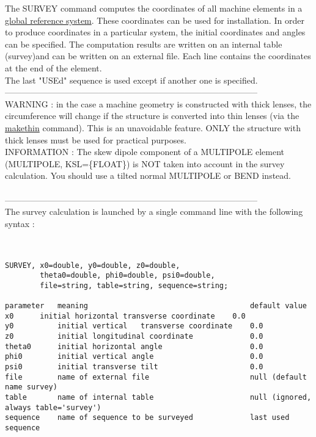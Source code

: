  The SURVEY command computes the coordinates of all machine elements in a \href{../Introduction/conventions.html}{global reference system}. These coordinates can be used for installation. In order to produce coordinates in a particular system, the initial coordinates and angles can be specified. The computation results are written on an internal table (survey)\nolinebreak and can be written on an external file. Each line contains the coordinates at the end of the element.
\\ The last "USEd" sequence is used except if another one is specified.
\\
-----------------------------------------------------------------------------------------
\\ WARNING : in the case a machine geometry is constructed with thick lenses, the circumference will change if the structure is converted into thin lenses (via the \href{../makethin/makethin.html}{makethin} command). This is an unavoidable feature. ONLY the structure with thick lenses must be used for practical purposes.
\\ INFORMATION : The skew dipole component of a MULTIPOLE element (MULTIPOLE, KSL=\{FLOAT\}) is NOT taken into account in the survey calculation. You should use a tilted normal MULTIPOLE or BEND instead.
\\
\\
-----------------------------------------------------------------------------------------
\\ The survey calculation is launched by a single command line with the following syntax : 
\\
\\
\begin{verbatim}

SURVEY, x0=double, y0=double, z0=double, 
        theta0=double, phi0=double, psi0=double,
        file=string, table=string, sequence=string;

parameter   meaning                                     default value
x0 	    initial horizontal transverse coordinate    0.0
y0          initial vertical   transverse coordinate    0.0
z0          initial longitudinal coordinate             0.0
theta0      initial horizontal angle                    0.0
phi0        initial vertical angle                      0.0
psi0        initial transverse tilt                     0.0
file        name of external file                       null (default name survey)
table       name of internal table                      null (ignored, always table='survey')
sequence    name of sequence to be surveyed             last used sequence
\end{verbatim}

